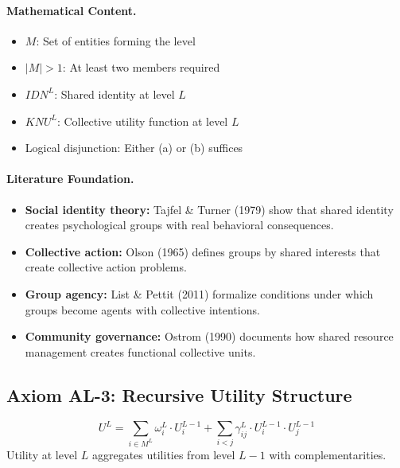 \paragraph{Mathematical Content.}
\begin{itemize}
\item $M$: Set of entities forming the level
\item $|M| > 1$: At least two members required
\item $IDN^L$: Shared identity at level $L$
\item $KNU^L$: Collective utility function at level $L$
\item Logical disjunction: Either (a) or (b) suffices
\end{itemize}

\paragraph{Literature Foundation.}
\begin{itemize}
\item \textbf{Social identity theory:} Tajfel \& Turner (1979) show that shared 
identity creates psychological groups with real behavioral consequences.
\item \textbf{Collective action:} Olson (1965) defines groups by shared interests 
that create collective action problems.
\item \textbf{Group agency:} List \& Pettit (2011) formalize conditions under 
which groups become agents with collective intentions.
\item \textbf{Community governance:} Ostrom (1990) documents how shared resource 
management creates functional collective units.
\end{itemize}

\subsection{Axiom AL-3: Recursive Utility Structure}

\begin{tcolorbox}[colback=gray!5!white, colframe=gray!75!black, title=Axiom AL-3: Recursive Structure]
\begin{equation}
\boxed{
U^L = \sum_{i \in M^L} \omega^L_i \cdot U^{L-1}_i + \sum_{i < j} \gamma^L_{ij} \cdot U^{L-1}_i \cdot U^{L-1}_j
}
\end{equation}
Utility at level $L$ aggregates utilities from level $L-1$ with complementarities.
\end{tcolorbox}

